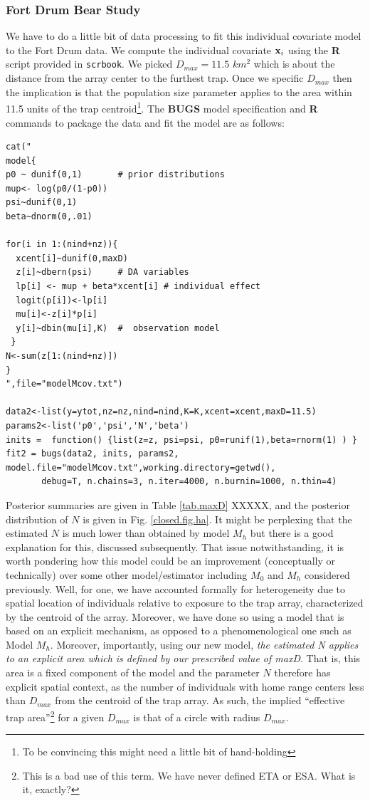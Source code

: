\subsubsection{Fort Drum Bear Study}

We have to do a little bit of data processing to fit this individual
covariate model to the Fort Drum data. 
We compute the individual covariate ${\bf x}_{i}$ using the {\bf R} script
provided in \mbox{\tt scrbook}.
We picked $D_{max} = 11.5$ $km^2$ which is about the distance from the
array center to the furthest trap. 
Once we specific $D_{max}$ then the implication is that the population
size parameter applies to the area 
within 11.5 units of the trap centroid\footnote{To be convincing
  this might  need a little bit of hand-holding}. The {\bf BUGS} model
specification and {\bf R} commands to package the data and fit the model are
as follows:

{\small
\begin{verbatim}
cat("
model{
p0 ~ dunif(0,1)       # prior distributions
mup<- log(p0/(1-p0))
psi~dunif(0,1)
beta~dnorm(0,.01)

for(i in 1:(nind+nz)){
  xcent[i]~dunif(0,maxD)
  z[i]~dbern(psi)     # DA variables
  lp[i] <- mup + beta*xcent[i] # individual effect
  logit(p[i])<-lp[i]
  mu[i]<-z[i]*p[i]
  y[i]~dbin(mu[i],K)  #  observation model
 }
N<-sum(z[1:(nind+nz)])
}
",file="modelMcov.txt")

data2<-list(y=ytot,nz=nz,nind=nind,K=K,xcent=xcent,maxD=11.5)
params2<-list('p0','psi','N','beta')
inits =  function() {list(z=z, psi=psi, p0=runif(1),beta=rnorm(1) ) }
fit2 = bugs(data2, inits, params2, model.file="modelMcov.txt",working.directory=getwd(),
       debug=T, n.chains=3, n.iter=4000, n.burnin=1000, n.thin=4)
\end{verbatim}
}

Posterior summaries are given in Table \ref{tab.maxD} XXXXX, and the
posterior distribution of $N$ is given in Fig. \ref{closed.fig.ha}. It might be
perplexing that the estimated $N$ is much lower than obtained by model
$M_h$ but there is a good explanation for this, discussed
subsequently. That issue notwithstanding, it is worth pondering how
this model could be an improvement (conceptually or technically) over
some other model/estimator including $M_0$ and $M_h$ considered
previously. Well, for one, we have accounted formally for
heterogeneity due to spatial location of individuals relative to
exposure to the trap array, characterized by the centroid of the
array. Moreover, we have done so using a model that is based on an
explicit mechanism, as opposed to a phenomenological one such as Model
$M_h$. Moreover, importantly, using our new model, {\it the estimated N
  applies to an explicit area which is defined by our prescribed value
  of maxD}. That is, this area is a fixed component of the model and
the parameter $N$ therefore has explicit spatial context, as the number
of individuals with home range centers less than $D_{max}$ from the
centroid of the trap array. As such, the implied ``effective trap
area''\footnote{This is a bad use of this term. We have never defined
  ETA or ESA. What is it, exactly?} for a given $D_{max}$ is that of a circle
with radius $D_{max}$.

